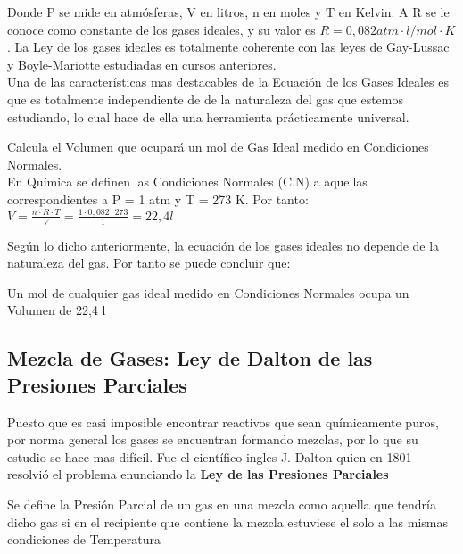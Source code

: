 Donde P se mide en atmósferas, V en litros, n en moles y T en Kelvin. A R se le conoce como constante de los gases ideales, y su valor es $R = 0,082 atm \cdot l/ mol\cdot K$. La Ley de los gases ideales es totalmente coherente con las leyes de Gay-Lussac y Boyle-Mariotte estudiadas en cursos anteriores.\\

Una de las características mas destacables de la Ecuación de los Gases Ideales es que es totalmente independiente de de la naturaleza del gas que estemos estudiando, lo cual hace de ella una herramienta prácticamente universal.\\

\begin{exercise}
	Calcula el Volumen que ocupará un mol de Gas Ideal medido en Condiciones Normales.\\
	
	En Química se definen las Condiciones Normales (C.N) a aquellas correspondientes a P = 1 atm y T = 273 K. Por tanto:\\
	
	$V = \frac{n \cdot R \cdot T}{V} = \frac{1 \cdot 0,082 \cdot 273}{1} = 22,4 l$
		
\end{exercise}

Según lo dicho anteriormente, la ecuación de los gases ideales no depende de la naturaleza del gas. Por tanto se puede concluir que:\\

\begin{definition}
	Un mol de cualquier gas ideal medido en Condiciones Normales ocupa un Volumen de 22,4 l
\end{definition}

\subsection{Mezcla de Gases: Ley de Dalton de las Presiones Parciales}

Puesto que es casi imposible encontrar reactivos que sean químicamente puros, por norma general los gases se encuentran formando mezclas, por lo que su estudio se hace mas difícil. Fue el científico ingles J. Dalton quien en 1801 resolvió el problema enunciando la \textbf{Ley de las Presiones Parciales}\\

\begin{definition}
	Se define la Presión Parcial de un gas en una mezcla como aquella que tendría dicho gas si en el recipiente que contiene la mezcla estuviese el solo a las mismas condiciones de Temperatura 
\end{definition}

